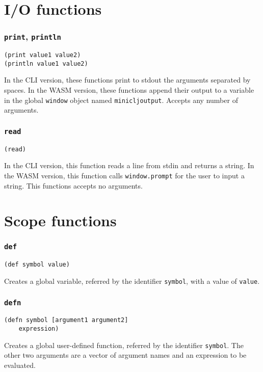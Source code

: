 \documentclass[11pt]{scrreprt}
\begin{document}
\section{I/O functions}
\subsubsection{\texttt{print}, \texttt{println}}
\begin{verbatim}
(print value1 value2)
(println value1 value2)
\end{verbatim}
In the CLI version, these functions print to stdout the arguments separated by spaces.
In the WASM version, these functions append their output to a variable in the global \texttt{window} object named \texttt{minicljoutput}.
Accepts any number of arguments.

\subsubsection{\texttt{read}}
\begin{verbatim}
(read)
\end{verbatim}
In the CLI version, this function reads a line from stdin and returns a string.
In the WASM version, this function calls \texttt{window.prompt} for the user to input a string.
This functions accepts no arguments.


\section{Scope functions}
\subsubsection{\texttt{def}}
\begin{verbatim}
(def symbol value)
\end{verbatim}
Creates a global variable, referred by the identifier \texttt{symbol}, with a value of \texttt{value}.

\subsubsection{\texttt{defn}}
\begin{verbatim}
(defn symbol [argument1 argument2]
    expression)
\end{verbatim}
Creates a global user-defined function, referred by the identifier \texttt{symbol}. The other two arguments are a vector of argument names and an expression to be evaluated.
\end{document}
